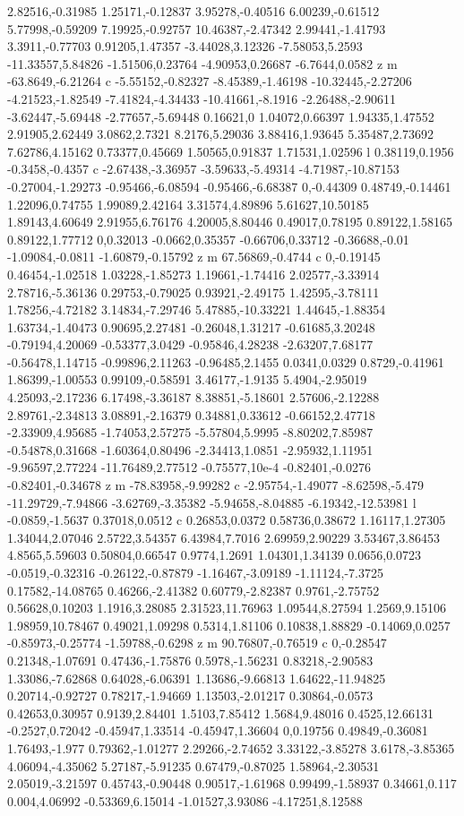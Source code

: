 2.82516,-0.31985 1.25171,-0.12837 3.95278,-0.40516 6.00239,-0.61512 5.77998,-0.59209 7.19925,-0.92757 10.46387,-2.47342 2.99441,-1.41793 3.3911,-0.77703 0.91205,1.47357 -3.44028,3.12326 -7.58053,5.2593 -11.33557,5.84826 -1.51506,0.23764 -4.90953,0.26687 -6.7644,0.0582 z m -63.8649,-6.21264 c -5.55152,-0.82327 -8.45389,-1.46198 -10.32445,-2.27206 -4.21523,-1.82549 -7.41824,-4.34433 -10.41661,-8.1916 -2.26488,-2.90611 -3.62447,-5.69448 -2.77657,-5.69448 0.16621,0 1.04072,0.66397 1.94335,1.47552 2.91905,2.62449 3.0862,2.7321 8.2176,5.29036 3.88416,1.93645 5.35487,2.73692 7.62786,4.15162 0.73377,0.45669 1.50565,0.91837 1.71531,1.02596 l 0.38119,0.1956 -0.3458,-0.4357 c -2.67438,-3.36957 -3.59633,-5.49314 -4.71987,-10.87153 -0.27004,-1.29273 -0.95466,-6.08594 -0.95466,-6.68387 0,-0.44309 0.48749,-0.14461 1.22096,0.74755 1.99089,2.42164 3.31574,4.89896 5.61627,10.50185 1.89143,4.60649 2.91955,6.76176 4.20005,8.80446 0.49017,0.78195 0.89122,1.58165 0.89122,1.77712 0,0.32013 -0.0662,0.35357 -0.66706,0.33712 -0.36688,-0.01 -1.09084,-0.0811 -1.60879,-0.15792 z m 67.56869,-0.4744 c 0,-0.19145 0.46454,-1.02518 1.03228,-1.85273 1.19661,-1.74416 2.02577,-3.33914 2.78716,-5.36136 0.29753,-0.79025 0.93921,-2.49175 1.42595,-3.78111 1.78256,-4.72182 3.14834,-7.29746 5.47885,-10.33221 1.44645,-1.88354 1.63734,-1.40473 0.90695,2.27481 -0.26048,1.31217 -0.61685,3.20248 -0.79194,4.20069 -0.53377,3.0429 -0.95846,4.28238 -2.63207,7.68177 -0.56478,1.14715 -0.99896,2.11263 -0.96485,2.1455 0.0341,0.0329 0.8729,-0.41961 1.86399,-1.00553 0.99109,-0.58591 3.46177,-1.9135 5.4904,-2.95019 4.25093,-2.17236 6.17498,-3.36187 8.38851,-5.18601 2.57606,-2.12288 2.89761,-2.34813 3.08891,-2.16379 0.34881,0.33612 -0.66152,2.47718 -2.33909,4.95685 -1.74053,2.57275 -5.57804,5.9995 -8.80202,7.85987 -0.54878,0.31668 -1.60364,0.80496 -2.34413,1.0851 -2.95932,1.11951 -9.96597,2.77224 -11.76489,2.77512 -0.75577,10e-4 -0.82401,-0.0276 -0.82401,-0.34678 z m -78.83958,-9.99282 c -2.95754,-1.49077 -8.62598,-5.479 -11.29729,-7.94866 -3.62769,-3.35382 -5.94658,-8.04885 -6.19342,-12.53981 l -0.0859,-1.5637 0.37018,0.0512 c 0.26853,0.0372 0.58736,0.38672 1.16117,1.27305 1.34044,2.07046 2.5722,3.54357 6.43984,7.7016 2.69959,2.90229 3.53467,3.86453 4.8565,5.59603 0.50804,0.66547 0.9774,1.2691 1.04301,1.34139 0.0656,0.0723 -0.0519,-0.32316 -0.26122,-0.87879 -1.16467,-3.09189 -1.11124,-7.3725 0.17582,-14.08765 0.46266,-2.41382 0.60779,-2.82387 0.9761,-2.75752 0.56628,0.10203 1.1916,3.28085 2.31523,11.76963 1.09544,8.27594 1.2569,9.15106 1.98959,10.78467 0.49021,1.09298 0.5314,1.81106 0.10838,1.88829 -0.14069,0.0257 -0.85973,-0.25774 -1.59788,-0.6298 z m 90.76807,-0.76519 c 0,-0.28547 0.21348,-1.07691 0.47436,-1.75876 0.5978,-1.56231 0.83218,-2.90583 1.33086,-7.62868 0.64028,-6.06391 1.13686,-9.66813 1.64622,-11.94825 0.20714,-0.92727 0.78217,-1.94669 1.13503,-2.01217 0.30864,-0.0573 0.42653,0.30957 0.9139,2.84401 1.5103,7.85412 1.5684,9.48016 0.4525,12.66131 -0.2527,0.72042 -0.45947,1.33514 -0.45947,1.36604 0,0.19756 0.49849,-0.36081 1.76493,-1.977 0.79362,-1.01277 2.29266,-2.74652 3.33122,-3.85278 3.6178,-3.85365 4.06094,-4.35062 5.27187,-5.91235 0.67479,-0.87025 1.58964,-2.30531 2.05019,-3.21597 0.45743,-0.90448 0.90517,-1.61968 0.99499,-1.58937 0.34661,0.117 0.004,4.06992 -0.53369,6.15014 -1.01527,3.93086 -4.17251,8.12588 